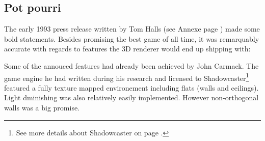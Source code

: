 \subsection{Pot pourri}
The early 1993 press release written by Tom Halls (see Annexe page \pageref{label_press_release}) made some bold statements. Besides promising the best game of all time, it was remarquably accurate with regards to features the 3D renderer would end up shipping with:\\
\par
\par
Some of the annouced features had already been achieved by John Carmack. The game engine he had written during his research and licensed to Shadowcaster\footnote{See more details about Shadowcaster on page \pageref{label_shadowcaster}.} featured a fully texture mapped environement including flats (walls and ceilings). Light dminishing was also relatively easily implemented. However non-orthogonal walls was a big promise.\\
\par
{}
